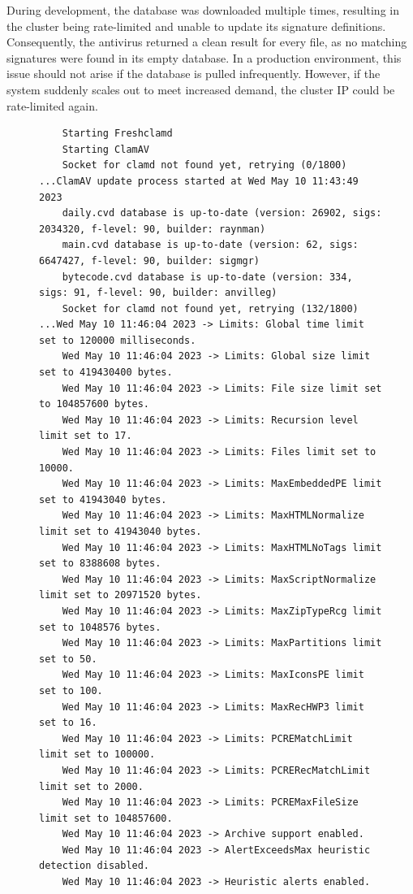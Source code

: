 \documentclass[12pt, conference, final, a4paper, onecolumn, compsoc]{IEEEtran}
\begin{document}
During development, the database was downloaded multiple times, resulting in the
cluster being rate-limited and unable to update its signature definitions.
Consequently, the antivirus returned a clean result for every file, as no
matching signatures were found in its empty database. In a production
environment, this issue should not arise if the database is pulled infrequently.
However, if the system suddenly scales out to meet increased demand, the cluster
IP could be rate-limited again.

\begin{figure}[H]
  \begin{lstlisting}
    Starting Freshclamd
    Starting ClamAV
    Socket for clamd not found yet, retrying (0/1800) ...ClamAV update process started at Wed May 10 11:43:49 2023
    daily.cvd database is up-to-date (version: 26902, sigs: 2034320, f-level: 90, builder: raynman)
    main.cvd database is up-to-date (version: 62, sigs: 6647427, f-level: 90, builder: sigmgr)
    bytecode.cvd database is up-to-date (version: 334, sigs: 91, f-level: 90, builder: anvilleg)
    Socket for clamd not found yet, retrying (132/1800) ...Wed May 10 11:46:04 2023 -> Limits: Global time limit set to 120000 milliseconds.
    Wed May 10 11:46:04 2023 -> Limits: Global size limit set to 419430400 bytes.
    Wed May 10 11:46:04 2023 -> Limits: File size limit set to 104857600 bytes.
    Wed May 10 11:46:04 2023 -> Limits: Recursion level limit set to 17.
    Wed May 10 11:46:04 2023 -> Limits: Files limit set to 10000.
    Wed May 10 11:46:04 2023 -> Limits: MaxEmbeddedPE limit set to 41943040 bytes.
    Wed May 10 11:46:04 2023 -> Limits: MaxHTMLNormalize limit set to 41943040 bytes.
    Wed May 10 11:46:04 2023 -> Limits: MaxHTMLNoTags limit set to 8388608 bytes.
    Wed May 10 11:46:04 2023 -> Limits: MaxScriptNormalize limit set to 20971520 bytes.
    Wed May 10 11:46:04 2023 -> Limits: MaxZipTypeRcg limit set to 1048576 bytes.
    Wed May 10 11:46:04 2023 -> Limits: MaxPartitions limit set to 50.
    Wed May 10 11:46:04 2023 -> Limits: MaxIconsPE limit set to 100.
    Wed May 10 11:46:04 2023 -> Limits: MaxRecHWP3 limit set to 16.
    Wed May 10 11:46:04 2023 -> Limits: PCREMatchLimit limit set to 100000.
    Wed May 10 11:46:04 2023 -> Limits: PCRERecMatchLimit limit set to 2000.
    Wed May 10 11:46:04 2023 -> Limits: PCREMaxFileSize limit set to 104857600.
    Wed May 10 11:46:04 2023 -> Archive support enabled.
    Wed May 10 11:46:04 2023 -> AlertExceedsMax heuristic detection disabled.
    Wed May 10 11:46:04 2023 -> Heuristic alerts enabled.

\end{lstlisting}
\end{figure}
\end{document}
